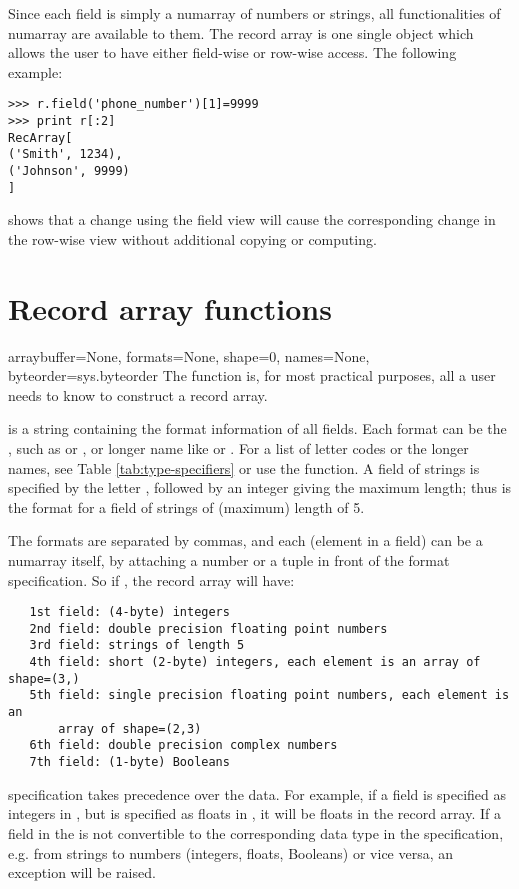 Since each field is simply a numarray of numbers or strings, all 
functionalities of numarray are available to them.  The record array is one 
single object which allows the user to have either field-wise or row-wise 
access.  The following example:
\begin{verbatim}
>>> r.field('phone_number')[1]=9999
>>> print r[:2]
RecArray[ 
('Smith', 1234),
('Johnson', 9999)
]
\end{verbatim}
shows that a change using the field view will cause the corresponding change 
in the row-wise view without additional copying or computing.

\section{Record array functions}
\label{sec:recarray-func}
\begin{funcdesc}{array}{buffer=None, formats=None, shape=0, 
names=None, byteorder=sys.byteorder}
\label{func:rec.array}
   The function  is, for most practical purposes, all a user needs 
   to know to construct a record array.

    is a string containing the format information of all fields.  
   Each format can be the , such as  or , 
   or longer name like  or .  For a list of letter 
   codes or the longer names, see Table \ref{tab:type-specifiers} or use 
   the  function.  A field of strings is specified by the 
   letter , followed by an integer giving the maximum length; thus 
    is the format for a field of strings of (maximum) length of 5.  

   The formats are separated by commas, and each  
   (element in a field) can be a numarray itself, by attaching a number or a 
   tuple in front of the format specification.  So if 
   , the record array 
   will have:
   \begin{verbatim}
   1st field: (4-byte) integers
   2nd field: double precision floating point numbers
   3rd field: strings of length 5
   4th field: short (2-byte) integers, each element is an array of shape=(3,)
   5th field: single precision floating point numbers, each element is an 
       array of shape=(2,3)
   6th field: double precision complex numbers
   7th field: (1-byte) Booleans
   \end{verbatim}
    specification takes precedence over the data.  For 
   example, if a field is specified as integers in , but is 
   specified as floats in , it will be floats in the record 
   array.  If a field in the  is not convertible to the 
   corresponding data type in the  specification, e.g. from 
   strings to numbers (integers, floats, Booleans) or vice versa, an 
   exception will be raised.
   

\end{funcdesc}
